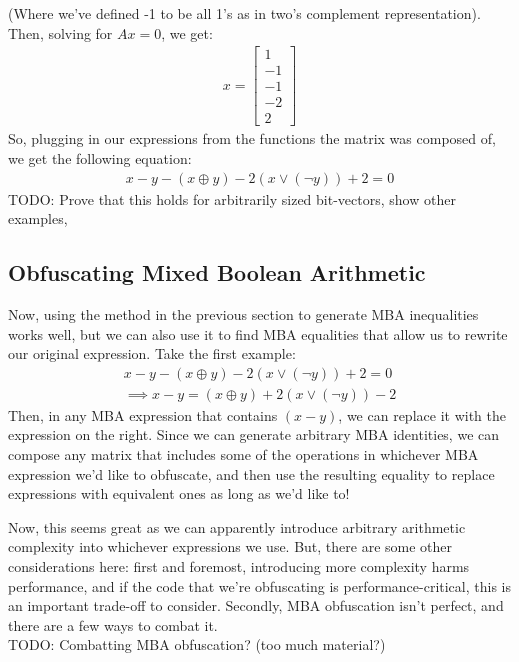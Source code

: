 (Where we've defined -1 to be all 1's as in two's complement representation).
Then, solving for $Ax = 0$, we get:
\begin{align*}
    x = \begin{bmatrix}
    1\\-1\\-1\\-2\\2
    \end{bmatrix}
\end{align*}
So, plugging in our expressions from the functions the matrix was composed of, 
we get the following equation:
\begin{align*}
    x - y - (x \oplus y) -2(x \lor (\neg y)) + 2 =0
\end{align*}
{\color{blue} TODO: Prove that this holds for arbitrarily sized bit-vectors, show other 
examples, }
\subsection{Obfuscating Mixed Boolean Arithmetic}
Now, using the method in the previous section to generate MBA inequalities works well,
but we can also use it to find MBA equalities that allow us to rewrite our original
expression. Take the first example:
\begin{align*} 
    x - y - (x \oplus y) -2(x \lor (\neg y)) + 2 = 0\\
    \implies x - y = (x \oplus y) + 2(x \lor (\neg y)) - 2
\end{align*}
Then, in any MBA expression that contains $(x - y)$, we can replace it with
the expression on the right. Since we can generate arbitrary MBA identities, 
we can compose any matrix that includes some of the operations in whichever
MBA expression we'd like to obfuscate, and then use the resulting equality
to replace expressions with equivalent ones as long as we'd like to! 
\par Now, this seems great as we can apparently introduce arbitrary arithmetic
complexity into whichever expressions we use. But, there are some other 
considerations here: first and foremost, introducing more complexity harms
performance, and if the code that we're obfuscating is performance-critical, 
this is an important trade-off to consider. Secondly, MBA obfuscation 
isn't perfect, and there are a few ways to combat it.\\
{\color{blue} TODO: Combatting MBA obfuscation? (too much material?)}
